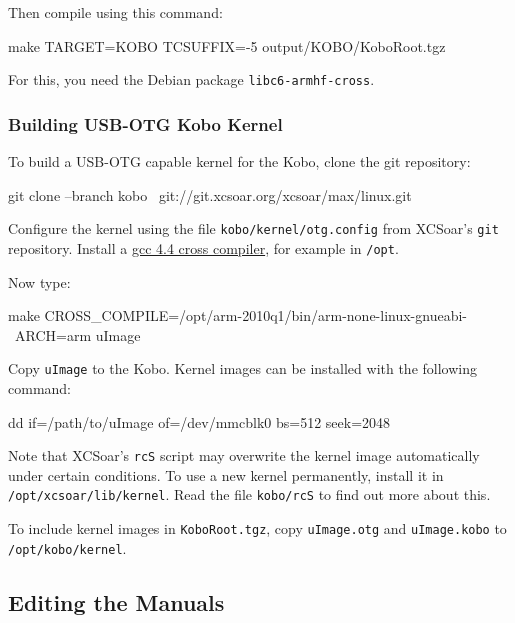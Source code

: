Then compile using this command:

\begin{verbatim*}
make TARGET=KOBO TCSUFFIX=-5 output/KOBO/KoboRoot.tgz
\end{verbatim*}

For this, you need the Debian package \verb|libc6-armhf-cross|.

\subsubsection{Building USB-OTG Kobo Kernel}

To build a USB-OTG capable kernel for the Kobo, clone the git
repository:

\begin{verbatim*}
git clone --branch kobo \
  git://git.xcsoar.org/xcsoar/max/linux.git
\end{verbatim*}

Configure the kernel using the file \texttt{kobo/kernel/otg.config}
from XCSoar's \texttt{git} repository.  Install a
\href{http://openlinux.amlogic.com:8000/download/ARM/gnutools/arm-2010q1-202-arm-none-linux-gnueabi-i686-pc-linux-gnu.tar.bz2}{gcc
  4.4 cross compiler}, for example in \texttt{/opt}.

Now type:

\begin{verbatim*}
make CROSS_COMPILE=/opt/arm-2010q1/bin/arm-none-linux-gnueabi- \
  ARCH=arm uImage
\end{verbatim*}

Copy \texttt{uImage} to the Kobo.  Kernel images can be installed with
the following command:

\begin{verbatim*}
dd if=/path/to/uImage of=/dev/mmcblk0 bs=512 seek=2048
\end{verbatim*}

Note that XCSoar's \texttt{rcS} script may overwrite the kernel image
automatically under certain conditions.  To use a new kernel
permanently, install it in \texttt{/opt/xcsoar/lib/kernel}.  Read the
file \texttt{kobo/rcS} to find out more about this.

To include kernel images in \texttt{KoboRoot.tgz}, copy
\texttt{uImage.otg} and \texttt{uImage.kobo} to
\texttt{/opt/kobo/kernel}.

\subsection{Editing the Manuals}

